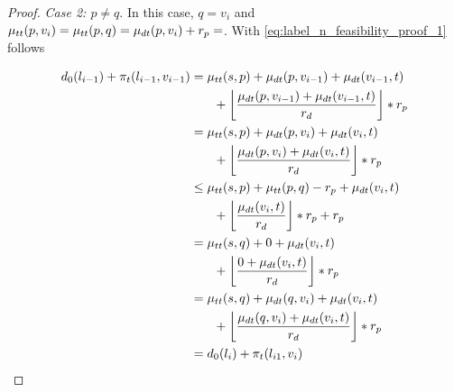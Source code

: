 \begin{proof}
	\emph{Case 2: $p \neq q$}. In this case, $q = v_i$ and $\mu_{tt}(p,v_i) = \mu_{tt}(p,q) = \mu_{dt}(p,v_i) + r_p = $. With \ref{eq:label_n_feasibility_proof_1} follows

	\begin{align}
		\begin{split}\label{eq:label_n_feasibility_proof_4}
			d_0(l_{i-1}) + \pi_t(l_{i-1},v_{i-1}) &= \traveltime(s,p) + \drivingtime(p,v_{i-1}) + \drivingtime(v_{i-1},t)\\
			& \phantom{{}=1} + \floor*{ \frac{\drivingtime(p,v_{i-1}) + \drivingtime(v_{i-1},t)}{\restr_d} } * \restr_p\\
			&= \traveltime(s,p) + \drivingtime(p,v_{i}) + \drivingtime(v_{i},t)\\
			& \phantom{{}=1} + \floor*{ \frac{\drivingtime(p,v_{i}) + \drivingtime(v_{i},t)}{\restr_d} } * \restr_p\\
			&\le \traveltime(s,p) + \traveltime(p,q) - \restr_p + \drivingtime(v_{i},t)\\
			& \phantom{{}=1} + \floor*{ \frac{\drivingtime(v_{i},t)}{\restr_d} } * \restr_p + \restr_p\\
			&= \traveltime(s,q) + 0 + \drivingtime(v_{i},t)\\
			& \phantom{{}=1} + \floor*{ \frac{0 + \drivingtime(v_{i},t)}{\restr_d} } * \restr_p\\
			&= \traveltime(s,q) + \drivingtime(q,v_{i}) + \drivingtime(v_{i},t)\\
			& \phantom{{}=1} + \floor*{ \frac{\drivingtime(q,v_{i}) + \drivingtime(v_{i},t)}{\restr_d} } * \restr_p\\
			&= d_0(l_{i}) + \pi_t(l_{i1},v_{i})
		\end{split}
	\end{align}
\end{proof}


